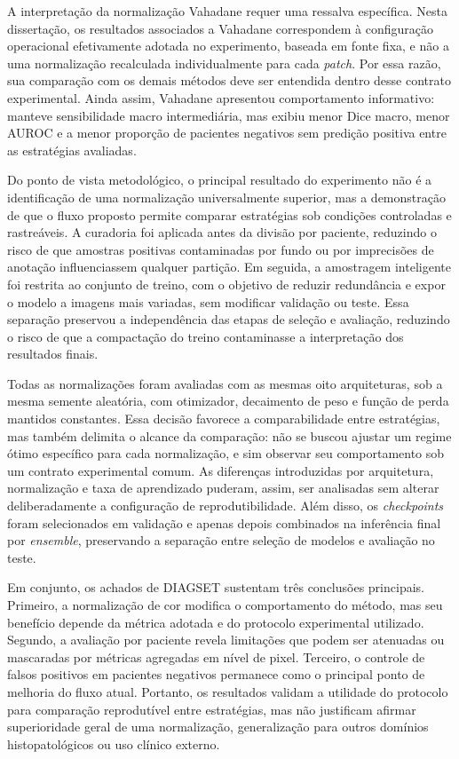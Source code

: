 A interpretação da normalização Vahadane requer uma ressalva específica. Nesta dissertação, os resultados associados a Vahadane correspondem à configuração operacional efetivamente adotada no experimento, baseada em fonte fixa, e não a uma normalização recalculada individualmente para cada \textit{patch}. Por essa razão, sua comparação com os demais métodos deve ser entendida dentro desse contrato experimental. Ainda assim, Vahadane apresentou comportamento informativo: manteve sensibilidade macro intermediária, mas exibiu menor Dice macro, menor AUROC e a menor proporção de pacientes negativos sem predição positiva entre as estratégias avaliadas.

Do ponto de vista metodológico, o principal resultado do experimento não é a identificação de uma normalização universalmente superior, mas a demonstração de que o fluxo proposto permite comparar estratégias sob condições controladas e rastreáveis. A curadoria foi aplicada antes da divisão por paciente, reduzindo o risco de que amostras positivas contaminadas por fundo ou por imprecisões de anotação influenciassem qualquer partição. Em seguida, a amostragem inteligente foi restrita ao conjunto de treino, com o objetivo de reduzir redundância e expor o modelo a imagens mais variadas, sem modificar validação ou teste. Essa separação preservou a independência das etapas de seleção e avaliação, reduzindo o risco de que a compactação do treino contaminasse a interpretação dos resultados finais.

Todas as normalizações foram avaliadas com as mesmas oito arquiteturas, sob a mesma semente aleatória, com otimizador, decaimento de peso e função de perda mantidos constantes. Essa decisão favorece a comparabilidade entre estratégias, mas também delimita o alcance da comparação: não se buscou ajustar um regime ótimo específico para cada normalização, e sim observar seu comportamento sob um contrato experimental comum. As diferenças introduzidas por arquitetura, normalização e taxa de aprendizado puderam, assim, ser analisadas sem alterar deliberadamente a configuração de reprodutibilidade. Além disso, os \textit{checkpoints} foram selecionados em validação e apenas depois combinados na inferência final por \textit{ensemble}, preservando a separação entre seleção de modelos e avaliação no teste.

Em conjunto, os achados de DIAGSET sustentam três conclusões principais. Primeiro, a normalização de cor modifica o comportamento do método, mas seu benefício depende da métrica adotada e do protocolo experimental utilizado. Segundo, a avaliação por paciente revela limitações que podem ser atenuadas ou mascaradas por métricas agregadas em nível de pixel. Terceiro, o controle de falsos positivos em pacientes negativos permanece como o principal ponto de melhoria do fluxo atual. Portanto, os resultados validam a utilidade do protocolo para comparação reprodutível entre estratégias, mas não justificam afirmar superioridade geral de uma normalização, generalização para outros domínios histopatológicos ou uso clínico externo.

